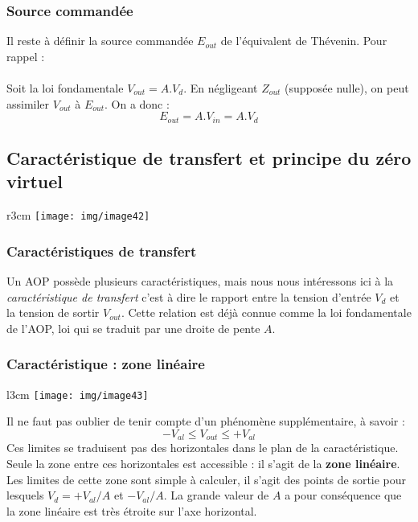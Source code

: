 
\subsubsection{Source commandée}
Il reste à définir la source commandée $E_{out}$ de l'équivalent de Thévenin. Pour rappel :\\

\ \\

Soit la loi fondamentale $V_{out} = A.V_d$. En négligeant $Z_{out}$ (supposée nulle), on peut assimiler $V_{out}$ à $E_{out}$. On a donc : 
\begin{equation}
E_{out} = A.V_{in} = A.V_d
\end{equation}

\subsection{Caractéristique de transfert et principe du zéro virtuel}\begin{wrapfigure}[6]{r}{3cm}
\texttt{[image: img/image42]}
\end{wrapfigure}
\subsubsection{Caractéristiques de transfert}

Un AOP possède plusieurs caractéristiques, mais nous nous intéressons ici à la \textit{caractéristique de transfert} c'est à dire le rapport entre la tension d'entrée $V_d$ et la tension de sortir $V_{out}$. Cette relation est déjà connue comme la loi fondamentale de l'AOP, loi qui se traduit par une droite de pente $A$.

\subsubsection{Caractéristique : zone linéaire}
\begin{wrapfigure}[8]{l}{3cm}
\texttt{[image: img/image43]}
\end{wrapfigure}
Il ne faut pas oublier de tenir compte d'un phénomène supplémentaire, à savoir :
\begin{equation}
-V_{al} \leq V_{out} \leq +V_{al}
\end{equation}
Ces limites se traduisent pas des horizontales dans le plan de la caractéristique. Seule la zone entre ces horizontales est accessible : il s'agit de la \textbf{zone linéaire}.\\
Les limites de cette zone sont simple à calculer, il s'agit des points de sortie pour lesquels $V_{d} = +V_{al}/A$ et $-V_{al}/A$. La grande valeur de $A$ a pour conséquence que la zone linéaire est très étroite sur l'axe horizontal.

